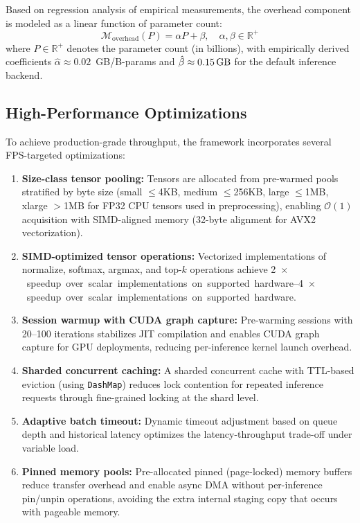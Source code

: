 \documentclass[10pt,twocolumn,a4paper]{article}
\theoremstyle{definition}
\theoremstyle{plain}
\begin{document}
Based on regression analysis of empirical measurements, the overhead component is modeled as a linear function of parameter count:
\begin{equation}
    \mathcal{M}_{\mathrm{overhead}}(P) = \alpha P + \beta, \quad \alpha, \beta \in \mathbb{R}^{+}
    \label{eq:overhead}
\end{equation}
where $P \in \mathbb{R}^{+}$ denotes the parameter count (in billions), with empirically derived coefficients $\hat{\alpha} \approx 0.02$~GB/B-params and $\hat{\beta} \approx \SI{0.15}{\giga\byte}$ for the default inference backend.

\subsection{High-Performance Optimizations}

To achieve production-grade throughput, the framework incorporates several FPS-targeted optimizations:

\begin{enumerate}
    \item \textbf{Size-class tensor pooling:} Tensors are allocated from pre-warmed pools stratified by byte size (small $\leq$4KB, medium $\leq$256KB, large $\leq$1MB, xlarge $>$1MB for FP32 CPU tensors used in preprocessing), enabling $\mathcal{O}(1)$ acquisition with SIMD-aligned memory (32-byte alignment for AVX2 vectorization).
    \item \textbf{SIMD-optimized tensor operations:} Vectorized implementations of normalize, softmax, argmax, and top-$k$ operations achieve \SIrange{2}{4}{$\times$} speedup over scalar implementations on supported hardware.
    \item \textbf{Session warmup with CUDA graph capture:} Pre-warming sessions with \numrange{20}{100} iterations stabilizes JIT compilation and enables CUDA graph capture for GPU deployments, reducing per-inference kernel launch overhead.
    \item \textbf{Sharded concurrent caching:} A sharded concurrent cache with TTL-based eviction (using \texttt{DashMap}) reduces lock contention for repeated inference requests through fine-grained locking at the shard level.
    \item \textbf{Adaptive batch timeout:} Dynamic timeout adjustment based on queue depth and historical latency optimizes the latency-throughput trade-off under variable load.
    \item \textbf{Pinned memory pools:} Pre-allocated pinned (page-locked) memory buffers reduce transfer overhead and enable async DMA without per-inference pin/unpin operations, avoiding the extra internal staging copy that occurs with pageable memory.
\end{enumerate}
\end{document}
